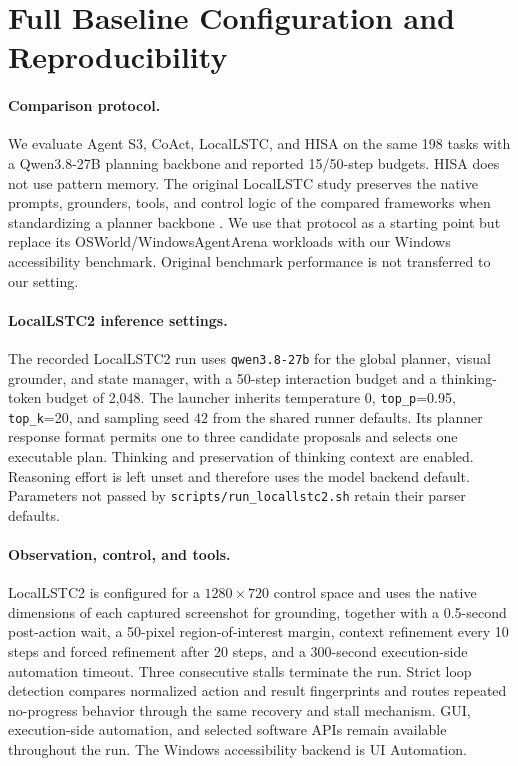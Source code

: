 \documentclass[11pt]{article}
\begin{document}
\section{Full Baseline Configuration and Reproducibility}
\label{app:baseline}

\paragraph{Comparison protocol.}
We evaluate Agent S3, CoAct, LocalLSTC, and HISA on the same 198 tasks with a Qwen3.8-27B planning backbone and reported 15/50-step budgets. HISA does not use pattern memory. The original LocalLSTC study preserves the native prompts, grounders, tools, and control logic of the compared frameworks when standardizing a planner backbone \citep{locallstc}. We use that protocol as a starting point but replace its OSWorld/WindowsAgentArena workloads with our Windows accessibility benchmark. Original benchmark performance is not transferred to our setting.

\paragraph{LocalLSTC2 inference settings.}
The recorded LocalLSTC2 run uses \texttt{qwen3.8-27b} for the global planner, visual grounder, and state manager, with a 50-step interaction budget and a thinking-token budget of 2,048. The launcher inherits temperature $0$, \texttt{top\_p}=0.95, \texttt{top\_k}=20, and sampling seed $42$ from the shared runner defaults. Its planner response format permits one to three candidate proposals and selects one executable plan. Thinking and preservation of thinking context are enabled. Reasoning effort is left unset and therefore uses the model backend default. Parameters not passed by \texttt{scripts/run\_locallstc2.sh} retain their parser defaults.

\paragraph{Observation, control, and tools.}
LocalLSTC2 is configured for a $1280\!\times\!720$ control space and uses the native dimensions of each captured screenshot for grounding, together with a 0.5-second post-action wait, a 50-pixel region-of-interest margin, context refinement every 10 steps and forced refinement after 20 steps, and a 300-second execution-side automation timeout. Three consecutive stalls terminate the run. Strict loop detection compares normalized action and result fingerprints and routes repeated no-progress behavior through the same recovery and stall mechanism. GUI, execution-side automation, and selected software APIs remain available throughout the run. The Windows accessibility backend is UI Automation.
\end{document}
